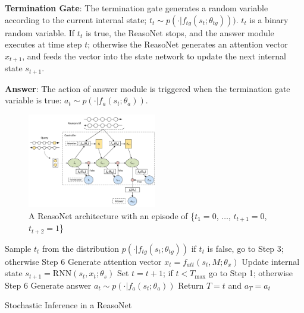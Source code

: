 \documentclass[sigconf]{acmart}
\begin{document}

\textbf{Termination Gate}: The termination gate generates a random variable according to the current internal state; $t_t \sim p( \cdot |f_{tg}(s_t; \theta_{tg})))$. $t_t$ is a binary random variable. If $t_t$ is true, the ReasoNet stops, and the answer module executes at time step $t$; otherwise the ReasoNet generates an attention vector $x_{t+1}$, and feeds the vector into the state network to update the next internal state $s_{t+1}$.

\textbf{Answer}: The action of answer module is triggered when the termination gate variable is true: $a_t \sim p( \cdot | f_a(s_t ; \theta_a) )$.

\begin{figure}[t]
	\hspace{-5mm}
  \includegraphics[width=0.5\textwidth]{figure/architecture.pdf} %
  \caption{{A ReasoNet architecture with an episode of \{$t_1=0$, $\ldots$, $t_{t+1}=0$, $t_{t+2}=1$\}}}
  \label{fig:reasonet}
\end{figure}

\begin{algorithm}[t]
	Sample $t_t$ from the distribution $p(\cdot|f_{tg}(s_t; \theta_{tg}))$\;
	if $t_t$ is false, go to Step 3; otherwise Step 6\;
	Generate attention vector $x_t = f_{att}(s_t, M; \theta_{x})$\;
	Update internal state $s_{t+1} = \text{RNN}(s_t, x_t; \theta_s)$\;
	Set $t = t + 1$; if $t < T_{\text{max}}$ go to Step 1; otherwise Step 6\;
	Generate answer $a_t \sim p(\cdot|f_a(s_t; \theta_a))$\;
	Return $T = t$ and $a_T = a_t$\;
	\caption{Stochastic Inference in a ReasoNet}
	\label{alg:inference_process}
\end{algorithm}
\end{document}
